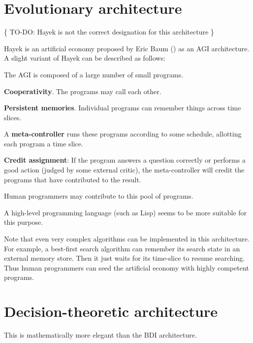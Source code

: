 \section{Evolutionary architecture}

\{ TO-DO:  Hayek is not the correct designation for this architecture \}

Hayek is an artificial economy proposed by Eric Baum (\citep*{Baum2004}) as an AGI architecture.  A slight variant of Hayek can be described as follows:

\begin{compactenum}
\item The AGI is composed of a large number of small programs.
\item \textbf{Cooperativity}.  The programs may call each other.
\item \textbf{Persistent memories}.  Individual programs can remember things across time slices.
\item A \textbf{meta-controller} runs these programs according to some schedule, allotting each program a time slice.
\item \textbf{Credit assignment}:  If the program answers a question correctly or performs a good action (judged by some external critic), the meta-controller will credit the programs that have contributed to the result.
\item Human programmers may contribute to this pool of programs.\\
\end{compactenum}

A high-level programming language (such as Lisp) seems to be more suitable for this purpose.

Note that even very complex algorithms can be implemented in this architecture.  For example, a best-first search algorithm can remember its search state in an external memory store.  Then it just waits for its time-slice to resume searching.  Thus human programmers can seed the artificial economy with highly competent programs.

\section{Decision-theoretic architecture}

This is mathematically more elegant than the BDI architecture.

